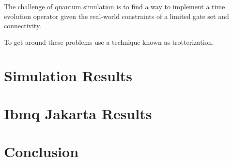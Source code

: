 \documentclass[aps,prl, reprint]{revtex4-2}
\begin{document}
The challenge of quantum simulation is to find a way to implement a time evolution operator given the real-world constraints of a limited gate set and connectivity.

To get around these problems use a technique known as trotterization. 

\section{Simulation Results}

\section{Ibmq Jakarta Results}

\section{Conclusion}


\end{document}
